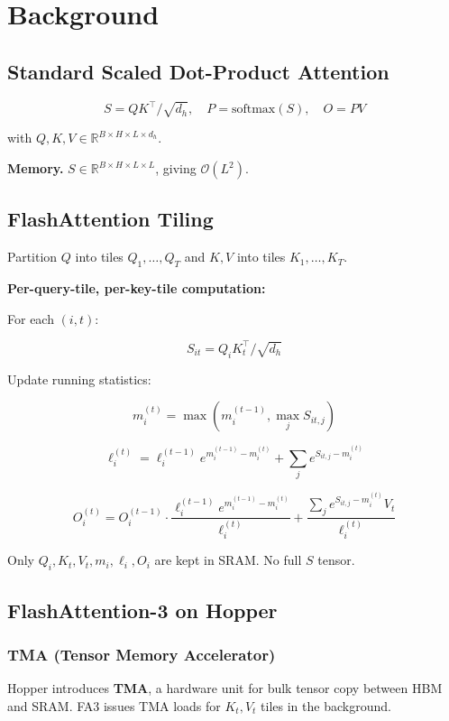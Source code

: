 \section{Background}

\subsection{Standard Scaled Dot-Product Attention}

\[
S = Q K^\top / \sqrt{d_h}, \quad P = \text{softmax}(S), \quad O = P V
\tag{3.1}
\]

with $Q, K, V \in \mathbb{R}^{B \times H \times L \times d_h}$.

\textbf{Memory.} $S \in \mathbb{R}^{B \times H \times L \times L}$, giving 
$\mathcal{O}(L^2)$.

\subsection{FlashAttention Tiling}

Partition $Q$ into tiles $Q_1, \ldots, Q_T$ and $K, V$ into tiles 
$K_1, \ldots, K_T$.

\textbf{Per-query-tile, per-key-tile computation:}

For each $(i, t)$:

\[
S_{it} = Q_i K_t^\top / \sqrt{d_h}
\tag{3.2}
\]

Update running statistics:

\[
m_i^{(t)} = \max(m_i^{(t-1)}, \max_j S_{it, j})
\tag{3.3}
\]

\[
\ell_i^{(t)} = \ell_i^{(t-1)} e^{m_i^{(t-1)} - m_i^{(t)}} + \sum_j e^{S_{it, j} - m_i^{(t)}}
\tag{3.4}
\]

\[
O_i^{(t)} = O_i^{(t-1)} \cdot \frac{\ell_i^{(t-1)} e^{m_i^{(t-1)} - m_i^{(t)}}}{\ell_i^{(t)}} + \frac{\sum_j e^{S_{it, j} - m_i^{(t)}} V_t}{\ell_i^{(t)}}
\tag{3.5}
\]

Only $Q_i, K_t, V_t, m_i, \ell_i, O_i$ are kept in SRAM. No full $S$ tensor.

\subsection{FlashAttention-3 on Hopper}

\subsubsection{TMA (Tensor Memory Accelerator)}

Hopper introduces \textbf{TMA}, a hardware unit for bulk tensor copy between HBM 
and SRAM. FA3 issues TMA loads for $K_t, V_t$ tiles in the background.

